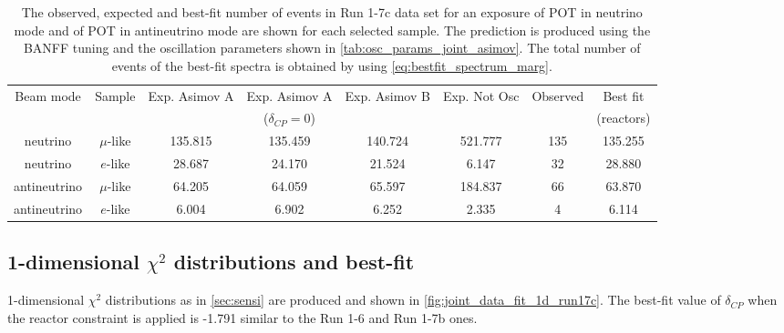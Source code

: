 \begin{table}[htb]
\centering
\begin{tabular}{| c | c | c | c | c | c | c | c |}
\hline
Beam mode	& Sample		& Exp. Asimov A  	& Exp. Asimov A	& Exp. Asimov B	& Exp. Not Osc			& Observed 	& Best fit\\
			& 			& 			  	& ($\delta_{CP}=0$)	& 				& 					& 		 	& (reactors) \\
\hline
neutrino	 	& $\mu$-like 	&135.815			& 135.459			& 140.724	 		& 521.777				& 135 		& 135.255 \\
neutrino 		& $e$-like  	& 28.687 			& 24.170			& 21.524			& 6.147				& 32 			& 28.880 \\
antineutrino 	& $\mu$-like 	& 64.205			& 64.059			& 65.597			& 184.837				& 66 			& 63.870 \\
antineutrino 	& $e$-like 	& 6.004			& 6.902			& 6.252			& 2.335				& 4 			& 6.114 \\
\hline
\end{tabular}
\caption{
The observed, expected and best-fit number of events in Run 1-7c data set
for an exposure
of \TotalPotNuRunOneSevenC POT in neutrino mode
and
of \TotalPotNuBarRunOneSevenC POT in antineutrino mode
are shown 
for each selected sample.
The prediction is produced using the BANFF tuning
and the oscillation parameters shown in \cref{tab:osc_params_joint_asimov}.
The total number of events of the best-fit spectra is obtained by using \cref{eq:bestfit_spectrum_marg}.
}
\label{tab:num_events_run17c}
\end{table}













%
%

\subsection {1-dimensional $\chi^2$ distributions and best-fit}
\label{sec:chisq_1d_run17c}



1-dimensional $\chi^2$ distributions as in \cref{sec:sensi} are produced
and shown in \cref{fig:joint_data_fit_1d_run17c}.
The best-fit value of $\delta_{CP}$ when the reactor constraint is applied is -1.791
similar to the Run 1-6 and Run 1-7b ones.
 
